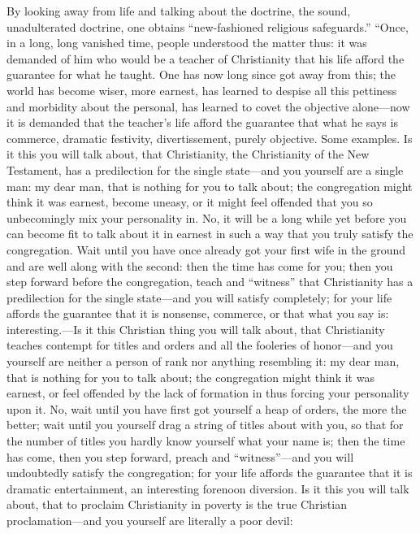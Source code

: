 \documentclass[12pt,a4paper,openany]{book}
\newcommand{\opage}[1]{\marginnote{\footnotesize\textit{[#1]}}}
\begin{document}
By looking away from life and talking about the doctrine, the sound,
unadulterated doctrine, one obtains ``new-fashioned religious
safeguards.'' ``Once, in a long, long vanished time, people understood
the matter thus: it was demanded of him who would be a teacher of
Christianity that his life afford the guarantee for what he taught. One
has now long since got away from this; the world has become wiser, more
earnest, has learned to despise all this pettiness and morbidity about
the personal, has learned to covet the objective alone---now it is
demanded that the teacher's life afford the guarantee that what he says
is commerce, dramatic festivity, divertissement, purely objective. Some
examples. Is it this you will talk about, that Christianity, the
Christianity of the New Testament, has a predilection for the single
state---and you yourself are a single man:
my dear man, that is nothing for you to talk about; the congregation might
think it was earnest, become uneasy, or it might feel offended that you
so unbecomingly mix your personality in. No, it will be a long while yet
before you can become fit to talk about it in earnest in such a way that
you truly satisfy the congregation. Wait until you have once already got
your first wife in the ground and are well along with the second: then
the time has come for you; then you step forward before the
congregation, teach and ``witness'' that Christianity has a predilection
for the single state---and you will satisfy completely; for your \opage{68}life
affords the guarantee that it is nonsense, commerce, or that what you
say is: interesting.---Is it this Christian thing you will talk about,
that Christianity teaches contempt for titles and orders and all the
fooleries of honor---and you yourself are neither a person of rank nor
anything resembling it: my dear man, that is nothing for you to talk
about; the congregation might think it was earnest, or feel offended by
the lack of formation in thus forcing your personality upon it. No, wait
until you have first got yourself a heap of orders, the more the better;
wait until you yourself drag a string of titles about with you, so that
for the number of titles you hardly know yourself what your name is; then
the time has come, then you step forward, preach and ``witness''---and you
will undoubtedly satisfy the congregation; for your life affords the
guarantee that it is dramatic entertainment, an interesting forenoon
diversion. Is it this you will talk about, that to proclaim Christianity
in poverty is the true Christian proclamation---and you yourself are
literally a poor devil: %
\end{document}
